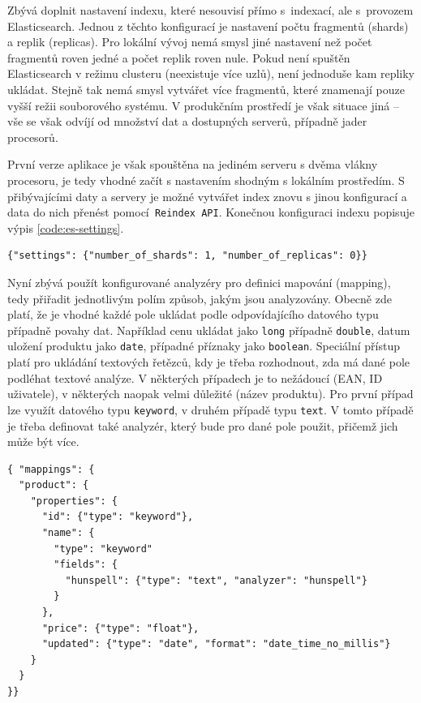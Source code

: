 \documentclass[FM,DP]{tulthesis}
\newenvironment{code}
    {\filbreak\captionsetup{type=listing}}{\filbreak}
\begin{document}
Zbývá doplnit nastavení indexu, které nesouvisí přímo s~indexací, ale s~provozem Elasticsearch.
Jednou z těchto konfigurací je nastavení počtu fragmentů (shards) a replik (replicas).
Pro lokální vývoj nemá smysl jiné nastavení než počet fragmentů roven jedné a počet
replik roven nule. Pokud není spuštěn Elasticsearch v režimu clusteru (neexistuje více uzlů), 
není jednoduše kam repliky ukládat. Stejně tak nemá smysl vytvářet více fragmentů, které
znamenají pouze vyšší režii souborového systému. V produkčním prostředí je však situace jiná --
vše se však odvíjí od množství dat a dostupných serverů, případně jader procesorů.

První verze aplikace je však spouštěna na jediném serveru s dvěma vlákny procesoru, je tedy
vhodné začít s nastavením shodným s lokálním prostředím. S přibývajícími daty a servery je
možné vytvářet index znovu s jinou konfigurací a data do nich přenést pomocí\verb| Reindex API|.
Konečnou konfiguraci indexu popisuje výpis \ref{code:es-settings}.

\begin{code}
\captionsetup{singlelinecheck=false,justification=raggedright}
\label{code:es-settings}
\begin{verbatim}
{"settings": {"number_of_shards": 1, "number_of_replicas": 0}}
\end{verbatim}
\end{code}

Nyní zbývá použít konfigurované analyzéry pro definici mapování (mapping), tedy přiřadit jednotlivým
polím způsob, jakým jsou analyzovány. Obecně zde platí, že je vhodné každé pole ukládat podle 
odpovídajícího datového typu případně povahy dat. Například cenu ukládat jako \verb|long| případně
\verb|double|, datum uložení produktu jako \verb|date|, případné příznaky jako \verb|boolean|.
Speciální přístup platí pro ukládání textových řetězců, kdy je třeba rozhodnout, zda má dané pole
podléhat textové analýze. V některých případech je to nežádoucí (EAN, ID uživatele), v některých
naopak velmi důležité (název produktu). Pro první případ lze využít datového typu \verb|keyword|, 
v druhém případě typu \verb|text|. V tomto případě je třeba definovat také analyzér, který bude pro 
dané pole použit, přičemž jich může být více.

\begin{code}
\captionsetup{singlelinecheck=false,justification=raggedright}
\label{code:es-mapping}
\begin{verbatim}
{ "mappings": {
  "product": {
    "properties": { 
      "id": {"type": "keyword"}, 
      "name": {
        "type": "keyword"
        "fields": {
          "hunspell": {"type": "text", "analyzer": "hunspell"}
        }
      },
      "price": {"type": "float"},
      "updated": {"type": "date", "format": "date_time_no_millis"}
    }
  }
}}
\end{verbatim}
\end{code}
\end{document}
